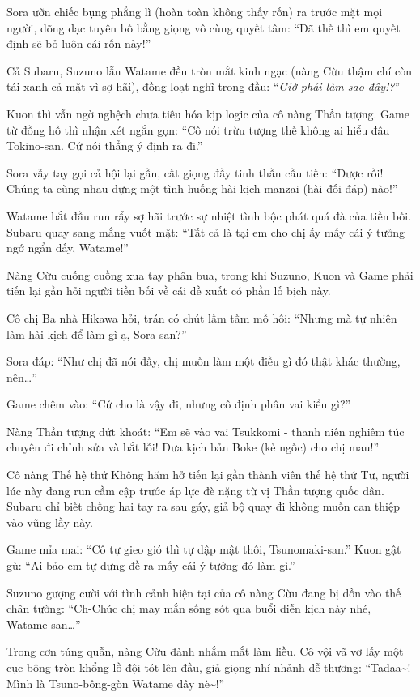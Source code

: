 \documentclass[../main.tex]{subfiles}
\begin{document}
Sora ưỡn chiếc bụng phẳng lì (hoàn toàn không thấy rốn) ra trước mặt mọi người, dõng dạc tuyên bố bằng giọng vô cùng quyết tâm: ``Đã thế thì em quyết định sẽ bỏ luôn cái rốn này!''


Cả Subaru, Suzuno lẫn Watame đều tròn mắt kinh ngạc (nàng Cừu thậm chí còn tái xanh cả mặt vì sợ hãi), đồng loạt nghĩ trong đầu: ``\textit{Giờ phải làm sao đây!?}''

Kuon thì vẫn ngờ nghệch chưa tiêu hóa kịp logic của cô nàng Thần tượng. Game từ đồng hồ thì nhận xét ngắn gọn: ``Cô nói trừu tượng thế không ai hiểu đâu Tokino-san. Cứ nói thẳng ý định ra đi.''

Sora vẫy tay gọi cả hội lại gần, cất giọng đầy tinh thần cầu tiến: ``Được rồi! Chúng ta cùng nhau dựng một tình huống hài kịch manzai (hài đối đáp) nào!''

Watame bắt đầu run rẩy sợ hãi trước sự nhiệt tình bộc phát quá đà của tiền bối. Subaru quay sang mắng vuốt mặt: ``Tất cả là tại em cho chị ấy mấy cái ý tưởng ngớ ngẩn đấy, Watame!''

Nàng Cừu cuống cuồng xua tay phân bua, trong khi Suzuno, Kuon và Game phải tiến lại gần hỏi người tiền bối về cái đề xuất có phần lố bịch này.

Cô chị Ba nhà Hikawa hỏi, trán có chút lấm tấm mồ hôi: ``Nhưng mà tự nhiên làm hài kịch để làm gì ạ, Sora-san?''

Sora đáp: ``Như chị đã nói đấy, chị muốn làm một điều gì đó thật khác thường, nên\dots''

Game chêm vào: ``Cứ cho là vậy đi, nhưng cô định phân vai kiểu gì?''

Nàng Thần tượng dứt khoát: ``Em sẽ vào vai Tsukkomi - thanh niên nghiêm túc chuyên đi chỉnh sửa và bắt lỗi! Đưa kịch bản Boke (kẻ ngốc) cho chị mau!''

Cô nàng Thế hệ thứ Không hăm hở tiến lại gần thành viên thế hệ thứ Tư, người lúc này đang run cầm cập trước áp lực đè nặng từ vị Thần tượng quốc dân. Subaru chỉ biết chống hai tay ra sau gáy, giả bộ quay đi không muốn can thiệp vào vũng lầy này.

Game mỉa mai: ``Cô tự gieo gió thì tự dập mật thôi, Tsunomaki-san.'' Kuon gật gù: ``Ai bảo em tự dưng đề ra mấy cái ý tưởng đó làm gì.''

Suzuno gượng cười với tình cảnh hiện tại của cô nàng Cừu đang bị dồn vào thế chân tường: ``Ch-Chúc chị may mắn sống sót qua buổi diễn kịch này nhé, Watame-san\dots''

Trong cơn túng quẫn, nàng Cừu đành nhắm mắt làm liều. Cô vội vã vơ lấy một cục bông tròn khổng lồ đội tót lên đầu, giả giọng nhí nhảnh dễ thương: ``Tadaa\~{}! Mình là Tsuno-bông-gòn Watame đây nè\~{}!''
\end{document}
